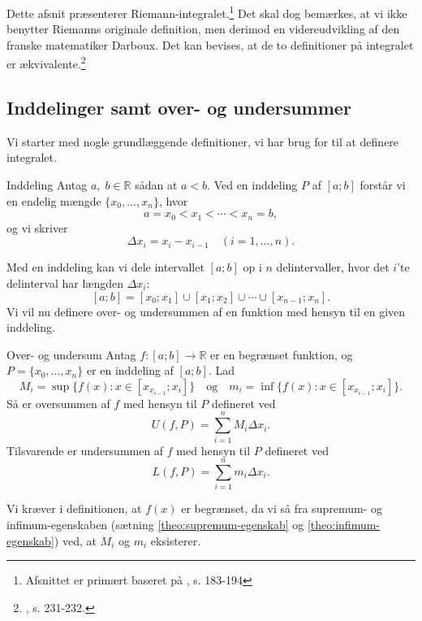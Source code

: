 Dette afsnit præsenterer Riemann-integralet.\footnote{Afsnittet er primært baseret på \cite{Abbott2002}, s. 183-194}
Det skal dog bemærkes, at vi ikke benytter Riemanns originale definition, men derimod en videreudvikling af den franske matematiker Darboux.
Det kan bevises, at de to definitioner på integralet er ækvivalente.\footnote{\cite{Bartle2010}, s. 231-232.}

\subsection{Inddelinger samt over- og undersummer}%
  \label{sub:Inddelinger samt over- og undersummer}

Vi starter med nogle grundlæggende definitioner, vi har brug for til at definere integralet.
\begin{definition}{Inddeling}{}
  Antag $a,\;b \in \mathbb{R}$ sådan at $a <b$.
  Ved en inddeling $P$ af $[a;b]$ forstår vi en endelig mængde $\{x_0,\dotsc, x_n\}$, hvor
  \[
  a=x_0<x_1<\cdots<x_n=b,
  \] 
  og vi skriver 
  \[
  \Delta x_i=x_i-x_{i-1} \quad (i=1,\ldots ,n).
  \]  
\end{definition}
Med en inddeling kan vi dele intervallet $[a;b]$ op i $n$ delintervaller, hvor det $i$'te delinterval har længden $\Delta x_i$:
\[
[a;b]=[x_0;x_1] \cup [x_1;x_2]\cup \cdots \cup [x _{n-1};x_n].
\] 
Vi vil nu definere over- og undersummen af en funktion med hensyn til en given inddeling.

\begin{definition}{Over- og undersum}{}
  Antag $f:[a;b] \to \mathbb{R}$ er en begrænset funktion, og $P=\{x_0,\ldots, x_n\}$ er en inddeling af $[a;b]$. 
  Lad 
  \[
  M_i=\sup \{ f(x):x \in [x _{x_{i-1}};x_i] \} \quad{\text{og}} \quad m_i=\inf \{ f(x):x \in [x _{x_{i-1}};x_i] \}.
  \] 
  Så er oversummen af $f$ med hensyn til $P$ defineret ved
  \[
  U(f, P)=\sum_{i=1}^{n} M_i \Delta x_i.
  \] 
  Tilsvarende er undersummen af $f$ med hensyn til $P$ defineret ved
  \[
  L(f, P)=\sum_{i=1}^{n} m_i \Delta x_i.
  \] 
\end{definition}

Vi kræver i definitionen, at $f(x)$ er begrænset, da vi så fra supremum- og infimum-egenskaben (sætning \ref{theo:supremum-egenskab} og \ref{theo:infimum-egenskab}) ved, at $M_i$ og $m_i$ eksisterer. 

